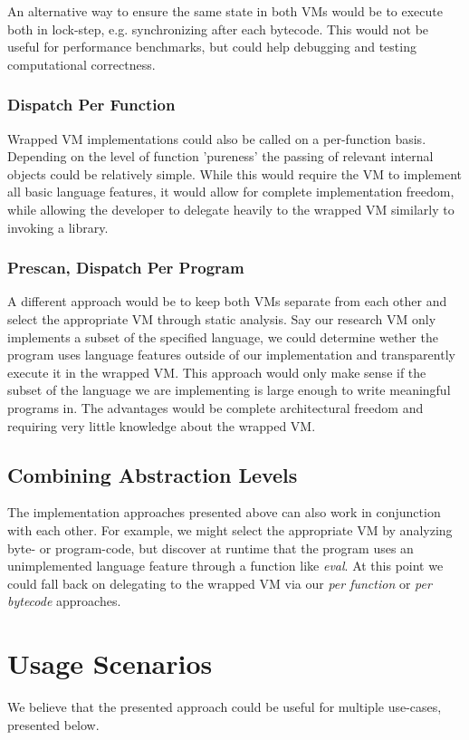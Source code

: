\documentclass[preprint, nonatbib]{sigplanconf}
\begin{document}
An alternative way to ensure the same state in both VMs would be to execute both in lock-step, e.g. synchronizing after each bytecode. This would not be useful for performance benchmarks, but could help debugging and testing computational correctness. 

\subsubsection{Dispatch Per Function}
Wrapped VM implementations could also be called on a per-function basis. Depending on the level of function 'pureness' the passing of relevant internal objects could be relatively simple. While this would require the VM to implement all basic language features, it would allow for complete implementation freedom, while allowing the developer to delegate heavily to the wrapped VM similarly to invoking a library. 

\subsubsection{Prescan, Dispatch Per Program}
A different approach would be to keep both VMs separate from each other and select the appropriate VM through static analysis. Say our research VM only implements a subset of the specified language, we could determine wether the program uses language features outside of our implementation and transparently execute it in the wrapped VM. This approach would only make sense if the subset of the language we are implementing is large enough to write meaningful programs in. The advantages would be complete architectural freedom and requiring very little knowledge about the wrapped VM. 

\subsection{Combining Abstraction Levels}
The implementation approaches presented above can also work in conjunction with each other. For example, we might select the appropriate VM by analyzing byte- or program-code, but discover at runtime that the program uses an unimplemented language feature through a function like \emph{eval}. At this point we could fall back on delegating to the wrapped VM via our \emph{per function} or \emph{per bytecode} approaches. 


\section{Usage Scenarios}
We believe that the presented approach could be useful for multiple use-cases, presented below.
\end{document}
